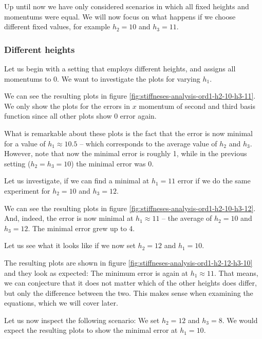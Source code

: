 \documentclass{article}
\begin{document}
Up until now we have only considered scenarios in which all fixed heights and momentums were equal. We will now focus on what happens if we choose different fixed values, for example $h_2=10$ and $h_3=11$.

\subsubsection{Different heights}
\label{sec:stiffness-analysis-ord1-differing-h2-10-h3-11}

Let us begin with a setting that employs different heights, and assigns all momentums to 0. We want to investigate the plots for varying $h_1$.



We can see the resulting plots in figure \ref{fig:stiffneses-analysis-ord1-h2-10-h3-11}. We only show the plots for the errors in $x$ momentum of second and third basis function since all other plots show 0 error again.

What is remarkable about these plots is the fact that the error is now minimal for a value of $h_1\approx 10.5$ -- which corresponds to the average value of $h_2$ and $h_3$. However, note that now the minimal error is roughly 1, while in the previous setting ($h_2=h_3=10$) the minimal error was 0.

Let us investigate, if we can find a minimal at $h_1=11$ error if we do the same experiment for $h_2=10$ and $h_3=12$.



We can see the resulting plots in figure \ref{fig:stiffneses-analysis-ord1-h2-10-h3-12}. And, indeed, the error is now minimal at $h_1\approx 11$ -- the average of $h_2=10$ and $h_3=12$. The minimal error grew up to 4.

Let us see what it looks like if we now set $h_2=12$ and $h_1=10$.



The resulting plots are shown in figure \ref{fig:stiffneses-analysis-ord1-h2-12-h3-10} and they look as expected: The minimum error is again at $h_1\approx 11$. That means, we can conjecture that it does not matter which of the other heights does differ, but only the difference between the two. This makes sense when examining the equations, which we will cover later.

Let us now inspect the following scenario: We set $h_2=12$ and $h_3=8$. We would expect the resulting plots to show the minimal error at $h_1=10$.
\end{document}
